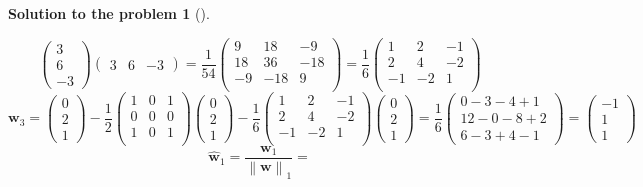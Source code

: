 \documentclass[12pt,a4]{article}
\newtheorem{solution}{Solution to the problem}
\newcommand{\bw}{{\mathbf w}}
\newcommand{\norm}[1]{\left\lVert#1\right\rVert}
\begin{document}
\begin{solution}[]
\begin{enumerate}[(a)]
\[\begin{pmatrix} 
 3 \\ 6 \\ -3
\end{pmatrix}
\begin{pmatrix}
 3 & 6 & -3
\end{pmatrix}
=
\frac{1}{54}
\begin{pmatrix} 
 9 & 18 & -9 \\
 18 & 36 & -18 \\
 -9 & -18 & 9 \\
\end{pmatrix}
=
\frac{1}{6}
\begin{pmatrix} 
 1 & 2 & -1 \\
 2 & 4 & -2 \\
 -1 & -2 & 1 \\
\end{pmatrix}
\]
\[
\bw_3 = 
\begin{pmatrix} 
 0 \\ 2 \\ 1
\end{pmatrix}
 - 
\frac{1}{2}
\begin{pmatrix} 
 1 & 0 & 1 \\
 0 & 0 & 0 \\
 1 & 0 & 1 \\
\end{pmatrix}
\begin{pmatrix} 
 0 \\ 2 \\ 1
\end{pmatrix}
-
\frac{1}{6}
\begin{pmatrix} 
 1 & 2 & -1 \\
 2 & 4 & -2 \\
 -1 & -2 & 1 \\
\end{pmatrix}
\begin{pmatrix} 
 0 \\ 2 \\ 1
\end{pmatrix}
=
\frac{1}{6}
\begin{pmatrix} 
 0-3- 4 + 1 \\ 12-0- 8 + 2 \\ 6-3+ 4 - 1
\end{pmatrix}
=
\begin{pmatrix} 
 -1 \\ 1 \\ 1
\end{pmatrix}
\]
\[
\hat \bw_1 = \frac{\bw_1}{\norm \bw_1} = 
\]
\end{enumerate}
\end{solution}
\end{document}
